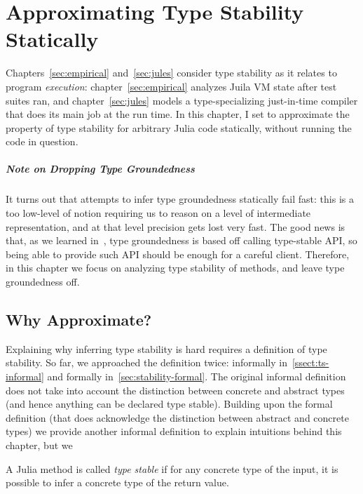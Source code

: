 \chapter{Approximating Type Stability Statically}\label{chap:approx}

Chapters~\ref{sec:empirical} and~\ref{sec:jules} consider type stability as it
relates to program \emph{execution}: chapter~\ref{sec:empirical} analyzes Juila
VM state after test suites ran, and chapter~\ref{sec:jules} models a
type-specializing just-in-time compiler that does its main job at the run time.
In this chapter, I set to approximate the property of type stability for
arbitrary Julia code statically, without running the code in question.

\paragraph{Note on Dropping Type Groundedness} It turns out that attempts to
infer type groundedness statically fail fast: this is a too low-level of
notion requiring us to reason on a level of intermediate representation, and at
that level precision gets lost very fast. The good news is that, as we learned
in~, type groundedness is based off calling type-stable
API, so being able to provide such API should be enough for a careful client.
Therefore, in this chapter we focus on analyzing type stability of methods, and
leave type groundedness off.

\section{Why Approximate?}

Explaining why inferring type stability is hard requires a definition of type
stability. So far, we approached the definition twice: informally
in~\ref{ssect:ts-informal} and formally in~\ref{sec:stability-formal}.
The original informal
definition does not take into account the distinction between concrete and
abstract types (and hence anything can be declared type stable).
Building upon the formal definition (that does acknowledge the distinction
between abstract and concrete types)
we provide another informal definition to explain intuitions behind this
chapter, but we
\begin{definition}
  A Julia method is called \emph{type stable} if for any concrete type of the
  input, it is possible to infer a concrete type of the return value.
\end{definition}

